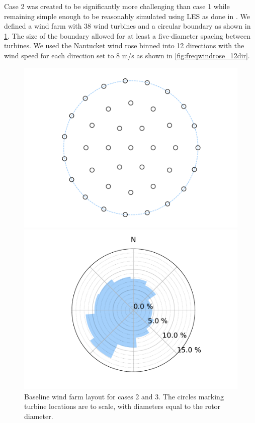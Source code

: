 \documentclass{jpconf}
\begin{document}
  Case 2 was created to be significantly more challenging than case 1 while remaining simple enough to be reasonably simulated using LES as done in \cite{thomas2019-les-validation}. We defined a wind farm with 38 wind turbines and a circular boundary as shown in \cref{fig:layout2and3}. The size of the boundary allowed for at least a five-diameter spacing between turbines. We used the Nantucket wind rose binned into 12 directions with the wind speed for each direction set to 8 m/s as shown in \cref{fig:freqwindrose_12dir}.
%
\begin{figure}[h!]
	\centering
	\begin{minipage}[t]{18pc}
		\centering
		\includegraphics[width=\textwidth, trim={1.5cm, 0cm, 1.5cm, 0cm}, clip]{final_images/layouts/38_turb_start.pdf}
		\caption{Baseline wind farm layout for cases 2 and 3. The circles marking turbine locations are to scale, with diameters equal to the rotor diameter.}
		\label{fig:layout2and3}
	\end{minipage} \hspace{1pc}
	\begin{minipage}[t]{18pc}
		\centering
		\includegraphics[width=\textwidth, trim={1.5cm 0cm 1.5cm 0cm}, clip]{final_images/windroses/freqwindrose_12_dir.pdf}

\end{minipage}
\end{figure}
\end{document}
